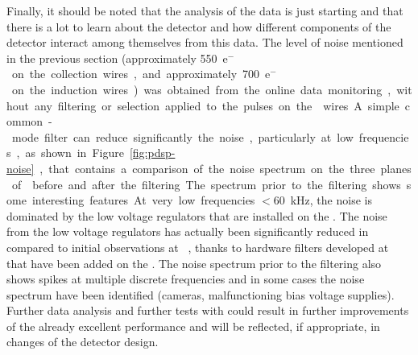 Finally, it should be noted that the analysis of the  data
is just starting and that there is a lot to learn about the
detector and how different components of the detector interact
among themselves from this data. The level of noise mentioned in
the previous section (approximately \SI{550}{e$^-$} on the collection wires,
and approximately \SI{700}{e$^-$} on the induction wires) 
was obtained from the online data monitoring, without any
filtering or selection applied to the pulses on the 
wires. A simple common-mode filter can reduce significantly the 
noise, particularly at low frequencies, as shown in Figure~\ref{fig:pdsp-noise},
that contains a comparison of the noise spectrum on the three planes 
of  before and after the filtering. The spectrum prior to
the filtering shows some interesting features. At very low
frequencies $<$\SI{60}{kHz}, the noise is dominated by the
low voltage regulators that are installed on the .
The noise from the low voltage regulators has actually
been significantly reduced in  compared to
initial observations at ~\cite{Acciarri:2017sde},
thanks to hardware filters developed at  that have been
added on the  . The noise spectrum prior to the
filtering also shows spikes at multiple discrete frequencies and in
some cases the noise spectrum have been identified (cameras,
malfunctioning bias voltage supplies). Further data analysis
and further tests with  could result in further
improvements of the already excellent  performance
and will be reflected, if appropriate, in changes of the
detector design.
